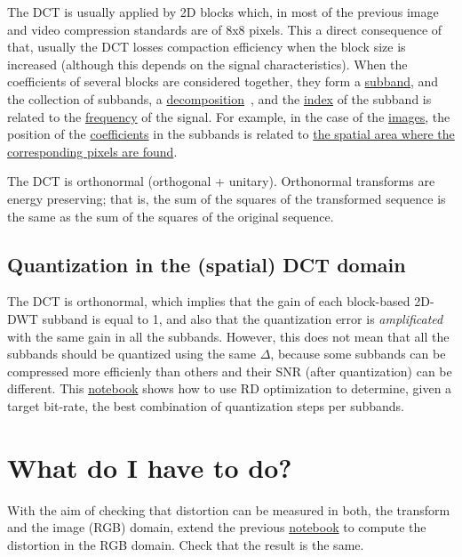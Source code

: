 The DCT is usually applied by 2D blocks which, in most of the previous
image and video compression standards are of 8x8 pixels. This a direct
consequence of that, usually the DCT losses compaction efficiency when
the block size is increased (although this depends on the signal
characteristics). When the coefficients of several blocks are
considered together, they form a
\href{https://en.wikipedia.org/wiki/Sub-band_coding}{subband}, and the
collection of subbands, a
\href{https://en.wikipedia.org/wiki/Discrete_wavelet_transform}{decomposition}~\cite{vetterli2014foundations},
and the
\href{https://en.wikipedia.org/wiki/Array_data_structure#Element_identifier_and_addressing_formulas}{index}
of the subband is related to the
\href{https://en.wikipedia.org/wiki/Frequency}{frequency} of the
signal. For example, in the case of the
\href{https://en.wikipedia.org/wiki/Digital_image}{images}, the
position of the
\href{https://en.wikipedia.org/wiki/Coefficient}{coefficients} in the
subbands is related to
\href{https://github.com/Sistemas-Multimedia/Sistemas-Multimedia.github.io/blob/master/milestones/07-DCT/block_DCT_compression.ipynb}{the
  spatial area where the corresponding pixels are found}.

The DCT is orthonormal (orthogonal + unitary). Orthonormal transforms
are energy preserving; that is, the sum of the squares of the
transformed sequence is the same as the sum of the squares of the
original sequence.

\subsection{Quantization in the (spatial) DCT domain}

The DCT is orthonormal, which implies that the gain of each
block-based 2D-DWT subband is equal to 1, and also that the
quantization error is \emph{amplificated} with the same gain in all
the subbands. However, this does not mean that all the subbands should
be quantized using the same $\Delta$, because some subbands can be
compressed more efficienly than others and their SNR (after
quantization) can be
different. This \href{https://github.com/Sistemas-Multimedia/Sistemas-Multimedia.github.io/blob/master/milestones/07-DCT/block_DCT_compression.ipynb}{notebook}
shows how to use RD optimization to determine, given a target
bit-rate, the best combination of quantization steps per subbands.

\section{What do I have to do?}
With the aim of checking that distortion can be measured in both, the
transform and the image (RGB) domain, extend the
previous \href{https://github.com/Sistemas-Multimedia/Sistemas-Multimedia.github.io/blob/master/milestones/07-DCT/block_DCT_compression.ipynb}{notebook}
to compute the distortion in the RGB domain. Check that the result is
the same.

